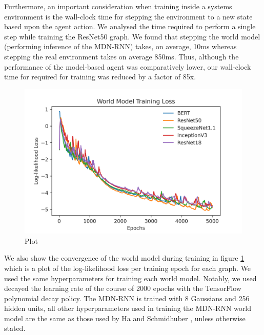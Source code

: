 Furthermore, an important consideration when training inside a systems environment is the wall-clock time for stepping the environment to a new state based upon the agent action. We analysed the time required to perform a single step while training the ResNet50 graph. We found that stepping the world model (performing inference of the MDN-RNN) takes, on average, 10ms whereas stepping the real environment takes on average 850ms. Thus, although the performance of the model-based agent was comparatively lower, our wall-clock time for required for training was reduced by a factor of 85x.

\begin{figure}[ht]
  \centering
  \includegraphics[width=1\columnwidth]{sections/5evaluation/images/mb_training_loss.png}
  \caption[Log-likelihood loss of world models]{Plot}
  \label{fig:eval:world-model-loss}
\end{figure}

We also show the convergence of the world model during training in figure \ref{fig:eval:world-model-loss} which is a plot of the log-likelihood loss per training epoch for each graph. We used the same hyperparameters for training each world model. Notably, we used decayed the learning rate of the course of 2000 epochs with the TensorFlow polynomial decay policy. The MDN-RNN is trained with 8 Gaussians and 256 hidden units, all other hyperparameters used in training the MDN-RNN world model are the same as those used by Ha and Schmidhuber \cite{ha2018worldmodels}, unless otherwise stated.

